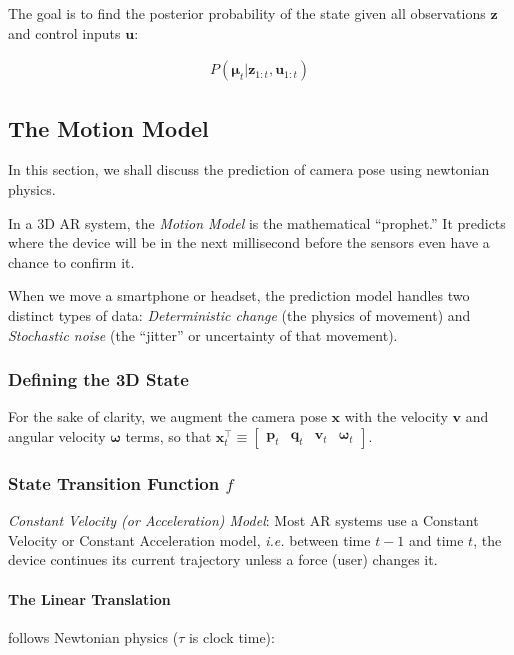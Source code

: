 \documentclass[11pt]{article}
\begin{document}
The goal is to find the posterior probability of the
state given all observations \(\mathbf{z}\) and control
inputs \(\mathbf{u}\):

\begin{align*}
  P \left(\boldsymbol{\mu}_t | \mathbf{z}_{1:t},
  \mathbf{u}_{1:t} \right)
\end{align*}
\subsection{The Motion Model}
\label{sec:orgb47b885}

In this section, we shall discuss the prediction of
camera pose using newtonian physics.

In a 3D AR system, the \emph{Motion Model} is the
mathematical ``prophet.'' It predicts where the device
will be in the next millisecond before the sensors even
have a chance to confirm it.

When we move a smartphone or headset, the prediction
model handles two distinct types of data:
\emph{Deterministic change} (the physics of movement) and
\emph{Stochastic noise} (the ``jitter'' or uncertainty of that
movement).
\subsubsection{Defining the 3D State}
\label{sec:orgf110d1f}
For the sake of clarity, we augment the camera pose
\(\mathbf{x}\) with the velocity \(\mathbf{v}\) and angular
velocity \(\boldsymbol{\omega}\) terms, so that
\(\mathbf{x}_t^{\top} \equiv \begin{bmatrix}
\mathbf{p}_t & \mathbf{q}_t & \mathbf{v}_t &
\boldsymbol{\omega}_t \end{bmatrix}\).
\subsubsection{State Transition Function \(f\)}
\label{sec:orgb2e8316}

\emph{Constant Velocity (or Acceleration) Model}: Most AR
systems use a Constant Velocity or Constant
Acceleration model, \emph{i.e.} between time \(t-1\) and time
\(t\), the device continues its current trajectory unless
a force (user) changes it.
\paragraph*{The Linear Translation}
\label{sec:org4be9055}

follows Newtonian physics (\(\tau\) is clock time):
\end{document}
